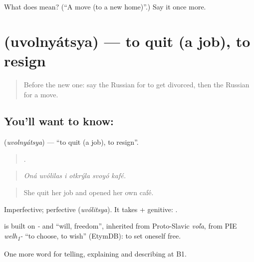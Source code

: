 \begin{tcolorbox}[breakable,colback=teal!4,colframe=teal!35!black,title={Before you move on}]
What does  mean? (\textquotedblleft{}A move (to a new home)\textquotedblright{}.) Say it once more.
\end{tcolorbox}
\section[\texorpdfstring{\ru{увольняться} (uvolnyátsya)}{увольняться (uvolnyátsya)}]{ (uvolnyátsya) — to quit (a job), to resign}

\label{lesson:RU-C307-uvolnyatsya}



\begin{quote}
Before the new one: say the Russian for to get divorced, then the Russian for a move.
\end{quote}

\subsection*{You'll want to know: }
\textbf{} (\emph{uvolnyátsya}) — \textquotedblleft{}to quit (a job), to resign\textquotedblright{}.

\begin{quote}
     .
\end{quote}

\begin{quote}
\emph{Oná uvólilas i otkrýla svoyó kafé.}
\end{quote}

\begin{quote}
She quit her job and opened her own café.
\end{quote}

Imperfective; perfective \emph{} (\emph{uvólitsya}). It takes \emph{} + genitive: \emph{  }.

\begin{cousinweb}
\emph{} is built on \emph{-} and \emph{} \textquotedblleft{}will, freedom\textquotedblright{}, inherited from Proto-Slavic \emph{voľa}, from PIE \emph{welh\textsubscript{1}-} \textquotedblleft{}to choose, to wish\textquotedblright{} (EtymDB): to set oneself free.
\end{cousinweb}

\begin{grammarlens}[title={What you've built}]
One more word for telling, explaining and describing at B1.
\end{grammarlens}

